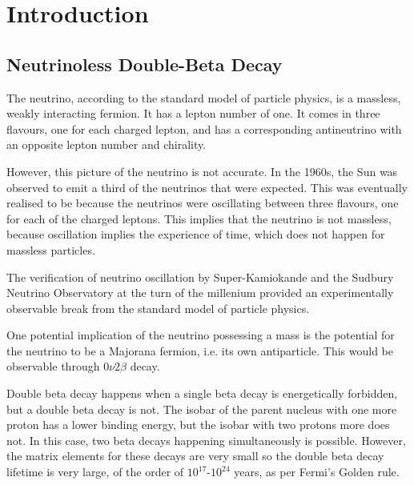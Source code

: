 
\chapter{Introduction} %
\label{Introduction} %


\label{Introduction}


\section{Neutrinoless Double-Beta Decay}

The neutrino, according to the standard model of particle physics, is a massless, weakly interacting fermion\cite{manchesterparticle}. It has a lepton number of one. It comes in three flavours, one for each charged lepton, and has a corresponding antineutrino with an opposite lepton number and chirality.

However, this picture of the neutrino is not accurate. In the 1960s, the Sun was observed to emit a third of the neutrinos that were expected\cite{homestake, solarneutrinoproblem}. This was eventually realised to be because the neutrinos were oscillating between three flavours, one for each of the charged leptons. This implies that the neutrino is not massless, because oscillation implies the experience of time, which does not happen for massless particles.

The verification of neutrino oscillation by Super-Kamiokande\cite{superkamiokande} and the Sudbury Neutrino Observatory\cite{sudbury} at the turn of the millenium provided an experimentally observable break from the standard model of particle physics.

One potential implication of the neutrino possessing a mass is the potential for the neutrino to be a Majorana fermion, i.e. its own antiparticle\cite{majorana}. This would be observable through $0\nu2\beta$ decay. 

Double beta decay happens when a single beta decay is energetically forbidden, but a double beta decay is not. The isobar of the parent nucleus with one more proton has a lower binding energy, but the isobar with two protons more does not. In this case, two beta decays happening simultaneously is possible. However, the matrix elements for these decays are very small so the double beta decay lifetime is very large, of the order of $10^{17}$-$10^{24}$ years\cite{krane}, as per Fermi's Golden rule.

